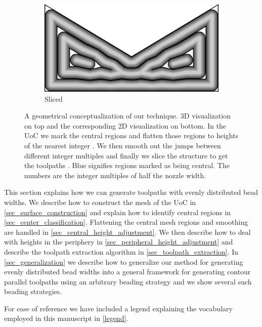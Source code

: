 \begin{figure}
\begin{subfigure}{\figwidth}
\includegraphics[width=\figwidthTwo]{sources/method/surface/sliced_2D.png}
\caption{Sliced}\label{3d_surface_overview_sliced}
\end{subfigure}
\caption{
A geometrical conceptualization of our technique.
3D visualization on top and the corresponding 2D visualization on bottom.
In the UoC 
we mark the central regions 
and flatten those regions to heights of the nearest integer .
We then smooth out the jumps between different integer multiples 
and finally we slice the structure to get the toolpaths .
Blue signifies regions marked as being central.
The numbers are the integer multiples of half the nozzle width.
}
\label{3d_surface_overview}
\end{figure}

This section explains how we can generate toolpaths with evenly distributed bead widths.
We describe how to construct the mesh of the UoC in \cref{sec_surface_construction} and
explain how to identify central regions in \cref{sec_center_classification}.
Flattening the central mesh regions and smoothing are handled in \cref{sec_central_height_adjustment}.
We then describe how to deal with heights in the periphery in \cref{sec_peripheral_height_adjustment}
and describe the toolpath extraction algorithm in \cref{sec_toolpath_extraction}.
In \cref{sec_generalization} we describe how to generalize our method for generating evenly distributed bead widths into a general framework for generating contour parallel toolpaths using an arbitrary beading strategy and we show several such beading strategies.


For ease of reference we have included a legend explaining the vocabulary employed in this manuscript in \cref{legend}.

